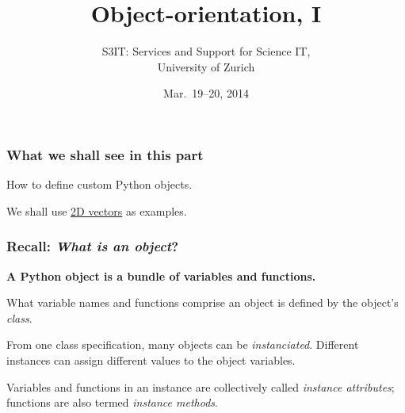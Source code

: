 \documentclass[english,serif,mathserif,xcolor=pdftex,dvipsnames,table]{beamer}
\title[OOP 1]{%
  Object-orientation, I
}
\author[S3IT]{%
  S3IT: Services and Support for Science IT, \\
  University of Zurich
}
\date{Mar.~19--20, 2014}
\begin{document}
\maketitle


\begin{frame}
  \frametitle{What we shall see in this part}

  How to define custom Python objects.

  \+
  We shall use \href{http://jccc-mpg.wikidot.com/vectors}{2D
    vectors} as examples.
\end{frame}


\begin{frame}
  \frametitle{Recall: \emph{What is an object}?}
  \textbf{A Python object is a bundle of variables and functions.}

  \+
  What variable names and functions comprise an object is defined
  by the object's \emph{class}.

  \+
  From one class specification, many objects can be
  \emph{instanciated}.  Different instances can assign different
  values to the object variables.

  \+
  Variables and functions in an instance are collectively called
  \emph{instance attributes}; functions are also termed \emph{instance
    methods}.
\end{frame}
\end{document}
